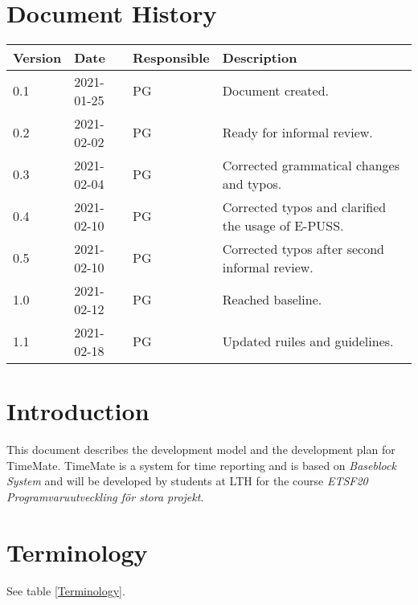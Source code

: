 \documentclass{article}
\date {#1}
\title {
    \documentNumber {00}    %
    \documentVersion {1.0}
    \documentTitle {Software Development Plan}
    \documentGroup {2}
    \documentResponsible {Project Management Group}
    \documentAuthors {Project Management Group}
    \documentDate {2021-02-12}
}
\begin{document}
\maketitle
\thispagestyle{empty}

\newpage

\tableofcontents

\newpage

\section{Document History}
\begin{tabular}{ l | l | l | l }
    Version & Date & Responsible & Description \\
    \hline
    0.1 & 2021-01-25 & PG & Document created. \\
    0.2 & 2021-02-02 & PG & Ready for informal review. \\
    0.3 & 2021-02-04 & PG & Corrected grammatical changes and typos. \\
    0.4 & 2021-02-10 & PG & Corrected typos and clarified the usage of E-PUSS. \\
    0.5 & 2021-02-10 & PG & Corrected typos after second informal review. \\
    1.0 & 2021-02-12 & PG & Reached baseline. \\
    1.1 & 2021-02-18 & PG & Updated ruiles and guidelines.\\
\end{tabular}

\section{Introduction}
    This document describes the development model and the development plan for TimeMate.
    TimeMate is a system for time reporting and is based on \textit{Baseblock System} and will be developed by students at LTH for the course
    \textit{ETSF20 Programvaruutveckling för stora projekt}.

\section{Terminology}
    
    See table \ref{Terminology}.
    
\end{document}
